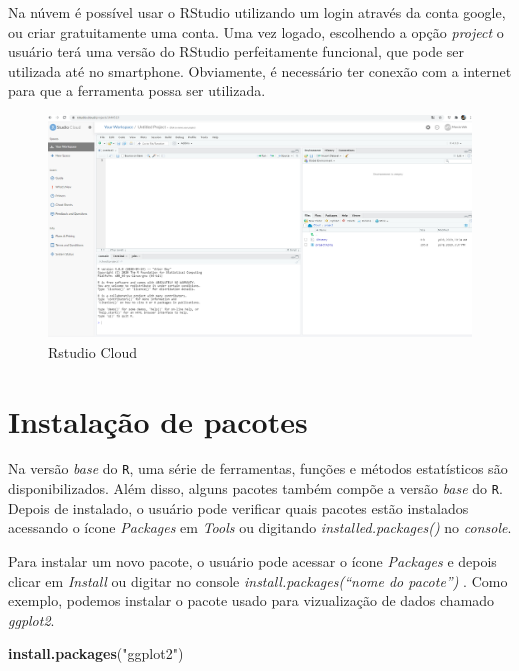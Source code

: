 \documentclass[
]{book}
\newenvironment{Shaded}{\begin{snugshade}}{\end{snugshade}}
\newcommand{\KeywordTok}[1]{\textcolor[rgb]{0.13,0.29,0.53}{\textbf{#1}}}
\newcommand{\NormalTok}[1]{#1}
\newcommand{\StringTok}[1]{\textcolor[rgb]{0.31,0.60,0.02}{#1}}
\theoremstyle{definition}
\theoremstyle{definition}
\theoremstyle{definition}
\theoremstyle{remark}
\begin{document}
Na núvem é possível usar o RStudio utilizando um login através da conta google, ou criar gratuitamente uma conta. Uma vez logado, escolhendo a opção \emph{project} o usuário terá uma versão do RStudio perfeitamente funcional, que pode ser utilizada até no smartphone. Obviamente, é necessário ter conexão com a internet para que a ferramenta possa ser utilizada.

\begin{figure}
\includegraphics[width=0.9\linewidth]{Figuras/RStudioCloud2} \caption{Rstudio Cloud}\label{fig:rstudiocloud2}
\end{figure}

\hypertarget{instalauxe7uxe3o-de-pacotes}{%
\section{Instalação de pacotes}\label{instalauxe7uxe3o-de-pacotes}}

Na versão \emph{base} do \texttt{R}, uma série de ferramentas, funções e métodos estatísticos são disponibilizados. Além disso, alguns pacotes também compõe a versão \emph{base} do \texttt{R}. Depois de instalado, o usuário pode verificar quais pacotes estão instalados acessando o ícone \emph{Packages} em \emph{Tools} ou digitando \emph{installed.packages()} no \emph{console}.

Para instalar um novo pacote, o usuário pode acessar o ícone \emph{Packages} e depois clicar em \emph{Install} ou digitar no console \emph{install.packages(``nome do pacote'')} . Como exemplo, podemos instalar o pacote usado para vizualização de dados chamado \emph{ggplot2}.

\begin{Shaded}
\begin{Highlighting}[]
\KeywordTok{install.packages}\NormalTok{(}\StringTok{"ggplot2"}\NormalTok{)}
\end{Highlighting}
\end{Shaded}
\end{document}
